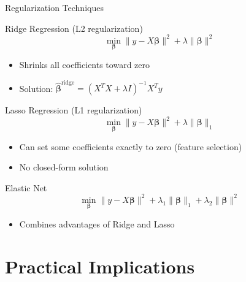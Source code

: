 \documentclass{beamer}
\begin{document}
\begin{frame}{Regularization Techniques}
  \begin{block}{Ridge Regression (L2 regularization)}
    \[
    \min_{\boldsymbol{\beta}} \|y - X\boldsymbol{\beta}\|^2 + \lambda \|\boldsymbol{\beta}\|^2
    \]
    \begin{itemize}
      \item Shrinks all coefficients toward zero
      \item Solution: $\hat{\boldsymbol{\beta}}^{\text{ridge}} = (X^TX + \lambda I)^{-1}X^Ty$
    \end{itemize}
  \end{block}
  
  \begin{block}{Lasso Regression (L1 regularization)}
    \[
    \min_{\boldsymbol{\beta}} \|y - X\boldsymbol{\beta}\|^2 + \lambda \|\boldsymbol{\beta}\|_1
    \]
    \begin{itemize}
      \item Can set some coefficients exactly to zero (feature selection)
      \item No closed-form solution
    \end{itemize}
  \end{block}
  
  \begin{block}{Elastic Net}
    \[
    \min_{\boldsymbol{\beta}} \|y - X\boldsymbol{\beta}\|^2 + \lambda_1 \|\boldsymbol{\beta}\|_1 + \lambda_2 \|\boldsymbol{\beta}\|^2
    \]
    \begin{itemize}
      \item Combines advantages of Ridge and Lasso
    \end{itemize}
  \end{block}
\end{frame}

\section{Practical Implications}
\end{document}
